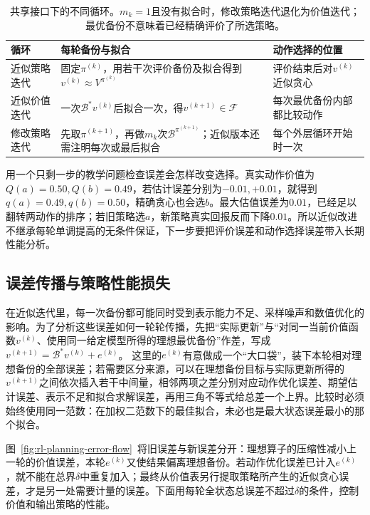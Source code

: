 \begin{table}[htbp]
 \centering
 \small
 \begin{tabularx}{\linewidth}{@{}l>{\raggedright\arraybackslash}X>{\raggedright\arraybackslash}X@{}}
  \toprule
  循环 & 每轮备份与拟合 & 动作选择的位置\\
  \midrule
  近似策略迭代 & 固定$\pi^{(k)}$，用若干次评价备份及拟合得到$v^{(k)}\approx V^{\pi^{(k)}}$ & 评价结束后对$v^{(k)}$近似贪心\\
  近似价值迭代 & 一次$\mathcal B^*v^{(k)}$后拟合一次，得$v^{(k+1)}\in\mathcal F$ & 每次最优备份内部都比较动作\\
  修改策略迭代 & 先取$\pi^{(k+1)}$，再做$m_k$次$\mathcal B^{\pi^{(k+1)}}$；近似版本还需注明每次或最后拟合 & 每个外层循环开始时一次\\
  \bottomrule
 \end{tabularx}
 \caption{共享接口下的不同循环。$m_k=1$且没有拟合时，修改策略迭代退化为价值迭代；最优备份不意味着已经精确评价了所选策略。}
 \label{tab:rl-planning-approximate-loops}
\end{table}

用一个只剩一步的教学问题检查误差会怎样改变选择。真实动作价值为$Q(a)=0.50,Q(b)=0.49$，若估计误差分别为$-0.01,+0.01$，就得到$q(a)=0.49,q(b)=0.50$，精确贪心也会选$b$。最大估值误差为$0.01$，已经足以翻转两动作的排序；若旧策略选$a$，新策略真实回报反而下降$0.01$。所以近似改进不继承每轮单调提高的无条件保证，下一步要把评价误差和动作选择误差带入长期性能分析。

\subsection{误差传播与策略性能损失}
\label{sec:rl-planning-error-propagation}

在近似迭代里，每一次备份都可能同时受到表示能力不足、采样噪声和数值优化的影响。为了分析这些误差如何一轮轮传播，先把“实际更新”与“对同一当前价值函数$v^{(k)}$、使用同一给定模型所得的理想最优备份”作差，写成
$v^{(k+1)}=\mathcal B^*v^{(k)}+e^{(k)}$。
这里的$e^{(k)}$有意做成一个“大口袋”，装下本轮相对理想备份的全部误差；若需要区分来源，可以在理想备份目标与实际更新所得的$v^{(k+1)}$之间依次插入若干中间量，相邻两项之差分别对应动作优化误差、期望估计误差、表示不足和拟合求解误差，再用三角不等式给总差一个上界。比较时必须始终使用同一范数：在加权二范数下的最佳拟合，未必也是最大状态误差最小的那个拟合。

图~\ref{fig:rl-planning-error-flow}~将旧误差与新误差分开：理想算子的压缩性减小上一轮的价值误差，本轮$e^{(k)}$又使结果偏离理想备份。若动作优化误差已计入$e^{(k)}$，就不能在总界$\delta$中重复加入；最终从价值表另行提取策略所产生的近似贪心误差，才是另一处需要计量的误差。下面用每轮全状态总误差不超过$\delta$的条件，控制价值和输出策略的性能。

